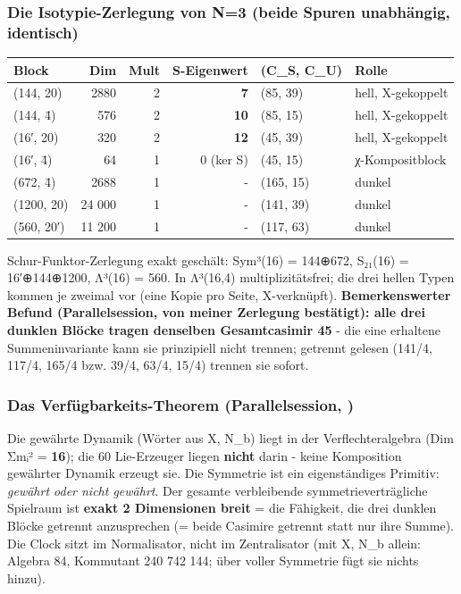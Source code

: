 \subsubsection{Die Isotypie-Zerlegung von N=3 (beide Spuren unabhängig,
identisch)}\label{die-isotypie-zerlegung-von-n3-beide-spuren-unabhuxe4ngig-identisch}

{\def\LTcaptype{none} %
\begin{longtable}[]{@{}lrrrll@{}}
\toprule\noalign{}
Block & Dim & Mult & S-Eigenwert & (C\_S, C\_U) & Rolle \\
\midrule\noalign{}
\endhead
\bottomrule\noalign{}
\endlastfoot
(144, 20) & 2880 & 2 & \textbf{7} & (85, 39) & hell, X-gekoppelt \\
(144, 4̄) & 576 & 2 & \textbf{10} & (85, 15) & hell, X-gekoppelt \\
(16′, 20) & 320 & 2 & \textbf{12} & (45, 39) & hell, X-gekoppelt \\
(16′, 4̄) & 64 & 1 & 0 (ker S) & (45, 15) & χ-Kompositblock \\
(672, 4̄) & 2688 & 1 & - & (165, 15) & dunkel \\
(1200, 20) & 24 000 & 1 & - & (141, 39) & dunkel \\
(560, 20′) & 11 200 & 1 & - & (117, 63) & dunkel \\
\end{longtable}
}

Schur-Funktor-Zerlegung exakt geschält: Sym³(16) = 144⊕\allowbreak{}672, S₂₁(16) =
16′⊕\allowbreak{}144⊕\allowbreak{}1200, Λ³(16) = 560. In Λ³(16,4) multiplizitätsfrei; die drei
hellen Typen kommen je zweimal vor (eine Kopie pro Seite, X-verknüpft).
\textbf{Bemerkenswerter Befund (Parallelsession, von meiner Zerlegung
bestätigt): alle drei dunklen Blöcke tragen denselben Gesamtcasimir 45}
- die eine erhaltene Summeninvariante kann sie prinzipiell nicht
trennen; getrennt gelesen (141/4, 117/4, 165/4 bzw. 39/4, 63/4, 15/4)
trennen sie sofort.

\subsubsection{\texorpdfstring{Das Verfügbarkeits-Theorem
(Parallelsession,
)}{Das Verfügbarkeits-Theorem (Parallelsession, )}}\label{das-verfuxfcgbarkeits-theorem-parallelsession-symmetry_availability.py}

Die gewährte Dynamik (Wörter aus X, N\_b) liegt in der
Verflechteralgebra (Dim Σmᵢ² = \textbf{16}); die 60 Lie-Erzeuger liegen
\textbf{nicht} darin - keine Komposition gewährter Dynamik erzeugt sie.
Die Symmetrie ist ein eigenständiges Primitiv: \emph{gewährt oder nicht
gewährt}. Der gesamte verbleibende symmetrieverträgliche Spielraum ist
\textbf{exakt 2 Dimensionen breit} = die Fähigkeit, die drei dunklen
Blöcke getrennt anzusprechen (= beide Casimire getrennt statt nur ihre
Summe). Die Clock sitzt im Normalisator, nicht im Zentralisator (mit X,
N\_b allein: Algebra 84, Kommutant 240 742 144; über voller Symmetrie
fügt sie nichts hinzu).

